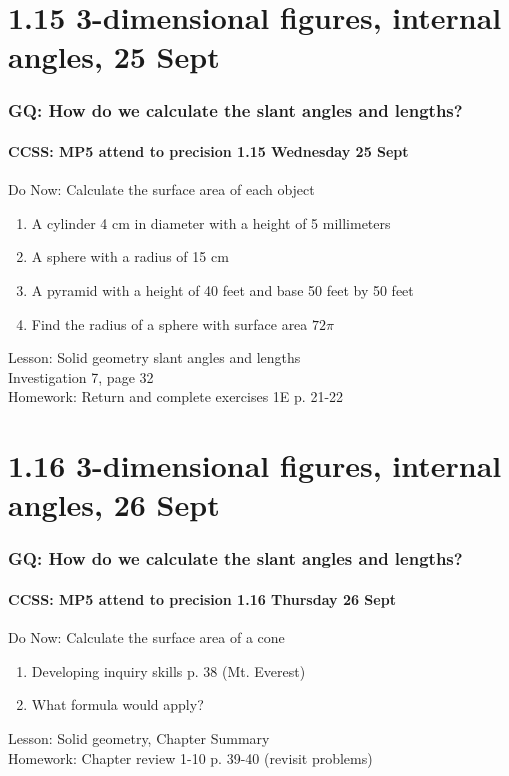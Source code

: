 \documentclass{beamer}
\begin{document}
  \section{1.15 3-dimensional figures, internal angles, 25 Sept}
  \frame
  {
    \frametitle{GQ: How do we calculate the slant angles and lengths?}
    \framesubtitle{CCSS: MP5 attend to precision \hfill \alert{1.15 Wednesday 25 Sept}}

    \begin{block}{Do Now: Calculate the surface area of each object}
      \begin{enumerate}
          \item A cylinder 4 cm in diameter with a height of 5 millimeters
          \item A sphere with a radius of 15 cm
          \item A pyramid with a height of 40 feet and base 50 feet by 50 feet
          \item Find the radius of a sphere with surface area $72 \pi$
      \end{enumerate}
      \end{block}
    Lesson: Solid geometry slant angles and lengths\\ \smallskip
    Investigation 7, page 32 \\ \bigskip
    Homework: Return and complete exercises 1E p. 21-22
  }

  \section{1.16 3-dimensional figures, internal angles, 26 Sept}
  \frame
  {
    \frametitle{GQ: How do we calculate the slant angles and lengths?}
    \framesubtitle{CCSS: MP5 attend to precision \hfill \alert{1.16 Thursday 26 Sept}}

    \begin{block}{Do Now: Calculate the surface area of a cone}
      \begin{enumerate}
          \item Developing inquiry skills p. 38 (Mt. Everest)
          \item What formula would apply?
       \end{enumerate}
      \end{block}
    Lesson: Solid geometry, Chapter Summary\\ \smallskip
    Homework: Chapter review 1-10 p. 39-40 (revisit problems)
  }
\end{document}
